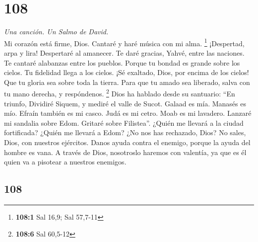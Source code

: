 \begin{paracol}{2}
\hypertarget{section-214}{%
\section{108}\label{section-214}}

\emph{Una canción. Un Salmo de David.}\\
 Mi corazón está firme, Dios. Cantaré y haré música con mi
alma. \footnote{\textbf{108:1} Sal 16,9; Sal 57,7-11} 
¡Despertad, arpa y lira! Despertaré al amanecer.  Te daré
gracias, Yahvé, entre las naciones. Te cantaré alabanzas entre los
pueblos.  Porque tu bondad es grande sobre los cielos. Tu
fidelidad llega a los cielos.  ¡Sé exaltado, Dios, por
encima de los cielos! Que tu gloria sea sobre toda la tierra.
 Para que tu amado sea liberado, salva con tu mano
derecha, y respóndenos. \footnote{\textbf{108:6} Sal 60,5-12}
 Dios ha hablado desde su santuario: ``En triunfo,
Dividiré Siquem, y mediré el valle de Sucot.  Galaad es
mía. Manasés es mío. Efraín también es mi casco. Judá es mi cetro.
 Moab es mi lavadero. Lanzaré mi sandalia sobre Edom.
Gritaré sobre Filistea''.  ¿Quién me llevará a la ciudad
fortificada? ¿Quién me llevará a Edom?  ¿No nos has
rechazado, Dios? No sales, Dios, con nuestros ejércitos. 
Danos ayuda contra el enemigo, porque la ayuda del hombre es vana.
 A través de Dios, nosotroslo haremos con valentía, ya
que es él quien va a pisotear a nuestros enemigos.

\switchcolumn
\begin{otherlanguage}{english}

\hypertarget{section-215}{%
\section{108}\label{section-215}}


\end{otherlanguage}
\end{paracol}
